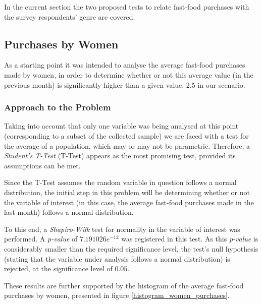 \documentclass[12pt]{article}
\begin{document}
In the current section the two proposed tests to relate fast-food purchases with the survey respondents' genre are covered.

\subsection{Purchases by Women}

As a starting point it was intended to analyse the average fast-food purchases made by women, in order to determine whether or not this average value (in the previous month) is significantly higher than a given value, 2.5 in our scenario.

\subsubsection{Approach to the Problem}

Taking into account that only one variable was being analysed at this point (corresponding to a subset of the collected sample) we are faced with a test for the average of a population, which may or may not be parametric. Therefore, a \emph{Student's T-Test} (T-Test) appears as the most promising test, provided its assumptions can be met.

Since the T-Test assumes the random variable in question follows a normal distribution, the initial step in this problem will be determining whether or not the variable of interest (in this case, the average fast-food purchases made in the last month) follows a normal distribution.

To this end, a \emph{Shapiro-Wilk} test for normality in the variable of interest was performed. A \emph{p-value} of $7.191026e^{-12}$ was registered in this test. As this \emph{p-value} is considerably smaller than the required significance level, the test's null hypothesis (stating that the variable under analysis follows a normal distribution) is rejected, at the significance level of $0.05$.

These results are further supported by the histogram of the average fast-food purchases by women, presented in figure \ref{histogram_women_purchases}.
\end{document}
